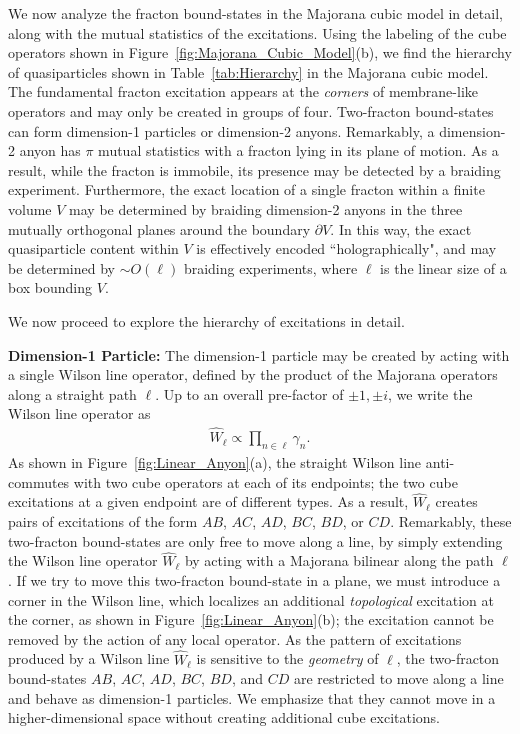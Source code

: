 \documentclass[aps,twocolumn,preprintnumbers,floatfix,showpacs,prx]{revtex4-1}
\begin{document}
We now analyze the fracton bound-states in the Majorana cubic model in detail,
along with the mutual statistics of the excitations.
Using the labeling of the cube operators shown in Figure~\ref{fig:Majorana_Cubic_Model}(b),
we find the hierarchy of quasiparticles shown in Table~\ref{tab:Hierarchy} in the Majorana cubic model.
The fundamental fracton excitation appears at the \emph{corners} of membrane-like operators
and may only be created in groups of four.
Two-fracton bound-states can form dimension-1 particles or dimension-2 anyons.
Remarkably, a dimension-2 anyon has $\pi$ mutual statistics with a fracton lying in its plane of motion.
As a result, while the fracton is immobile, its presence may be detected by a braiding experiment.
Furthermore, the exact location of a single fracton within a finite volume $V$ may be determined by braiding dimension-2 anyons in the three mutually orthogonal planes around the boundary $\partial V$. In this way, the exact quasiparticle content within $V$ is effectively encoded ``holographically", and may be determined by $\sim O(\ell)$ braiding experiments, where $\ell$ is the linear size of a box bounding $V$.

We now proceed to explore the hierarchy of excitations in detail.




{\bf Dimension-1 Particle:}
The dimension-1 particle may be created by acting with a single  Wilson line operator,
defined by the product of the Majorana operators along a straight path $\ell$.
Up to an overall pre-factor of $\pm 1,\pm i$, we write the Wilson line operator as
\begin{align}
\hat{W}_{\ell} \propto \prod_{n \in \ell}\gamma_{n}.
\end{align} 
As shown in Figure~\ref{fig:Linear_Anyon}(a),
the straight Wilson line anti-commutes with two cube operators at each of its endpoints;
the two cube excitations at a given endpoint are of different types.
As a result, $\hat{W}_{\ell}$ creates pairs of excitations of the form $AB$, $AC$, $AD$, $BC$, $BD$, or $CD$.
Remarkably, these two-fracton bound-states are only free to move along a line,
by simply extending the Wilson line operator $\hat{W}_{\ell}$ by acting with a Majorana bilinear along the path $\ell$.
If we try to move this two-fracton bound-state in a plane,
we must introduce a corner in the Wilson line,
which localizes an additional \emph{topological} excitation at the corner, as shown in Figure~\ref{fig:Linear_Anyon}(b); the excitation cannot be removed by the action of any local operator.
As the pattern of excitations produced by a Wilson line $\hat{W}_{\ell}$ is sensitive to the \emph{geometry} of $\ell$,
the two-fracton bound-states $AB$, $AC$, $AD$, $BC$, $BD$, and $CD$ are restricted to move along a line and behave as dimension-1 particles.
We emphasize that they cannot move
in a higher-dimensional space without creating additional cube excitations.
\end{document}
